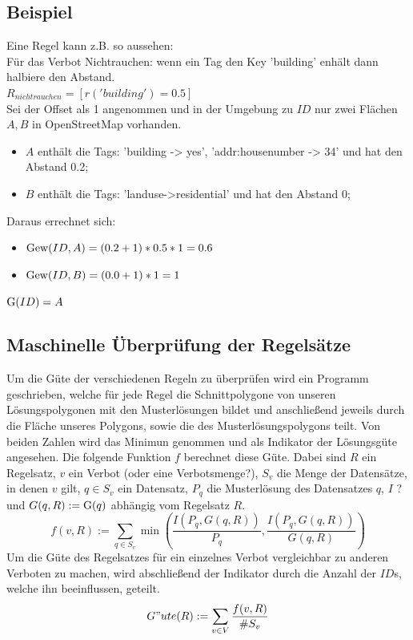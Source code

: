 \subsection{Beispiel}
Eine Regel kann z.B. so aussehen:\\
Für das Verbot Nichtrauchen: wenn ein Tag den Key 'building' enhält dann halbiere den Abstand. \\
$R_{nichtrauchen} = [r('building') = 0.5]$\\
\newline
Sei der Offset als 1 angenommen und in der Umgebung zu $ID$ nur zwei
Flächen $A,B$ in OpenStreetMap vorhanden.
\begin{itemize}
\item $A$ enthält die Tags: 'building -> yes', 'addr:housenumber -> 34' und hat den Abstand 0.2;
\item $B$ enthält die Tags: 'landuse->residential' und hat den Abstand 0;
\end{itemize}
Daraus errechnet sich:
\begin{itemize}
\item $\operatorname{Gew}(ID,A) = (0.2 + 1) * 0.5 * 1 = 0.6$
\item $\operatorname{Gew}(ID,B) = (0.0 + 1) * 1 = 1$
\end{itemize}

$\operatorname{G}(ID) = A$

\subsection{Maschinelle Überprüfung der Regelsätze}
Um die Güte der verschiedenen Regeln zu überprüfen wird ein Programm geschrieben, welche für jede Regel die Schnittpolygone von unseren Lösungspolygonen mit
den Musterlösungen bildet und anschließend jeweils durch die Fläche unseres Polygons, sowie die des Musterlösungspolygons teilt.
Von beiden Zahlen wird das Minimun genommen und als Indikator der Lösungsgüte angesehen. Die folgende Funktion $f$ berechnet diese Güte.
Dabei sind $R$ ein Regelsatz, $v$ ein Verbot (oder eine Verbotsmenge?), $S_v$ die Menge der Datensätze, in denen $v$ gilt, 
$q\in S_v$ ein Datensatz, $P_q$ die Musterlösung des Datensatzes $q$, $I$ ? und $G(q,R):=\operatorname{G}(q)$ abhängig vom Regelsatz $R$.\\
\begin{equation}
f(v,R) := \sum_{q\in S_v} \min \left(\frac{I(P_q,G(q,R))}{P_q},\frac{I(P_q,G(q,R))}{G(q,R)}\right)
\end{equation}
Um die Güte des Regelsatzes für ein einzelnes Verbot vergleichbar zu anderen Verboten zu machen, wird abschließend der Indikator durch
die Anzahl der $ID$s, welche ihn beeinflussen, geteilt.\\
\begin{equation}
\label{eq:guete}
G"ute(R) := \sum_{v \in V} \frac{ f(v,R)}{\#S_v}
\end{equation}

